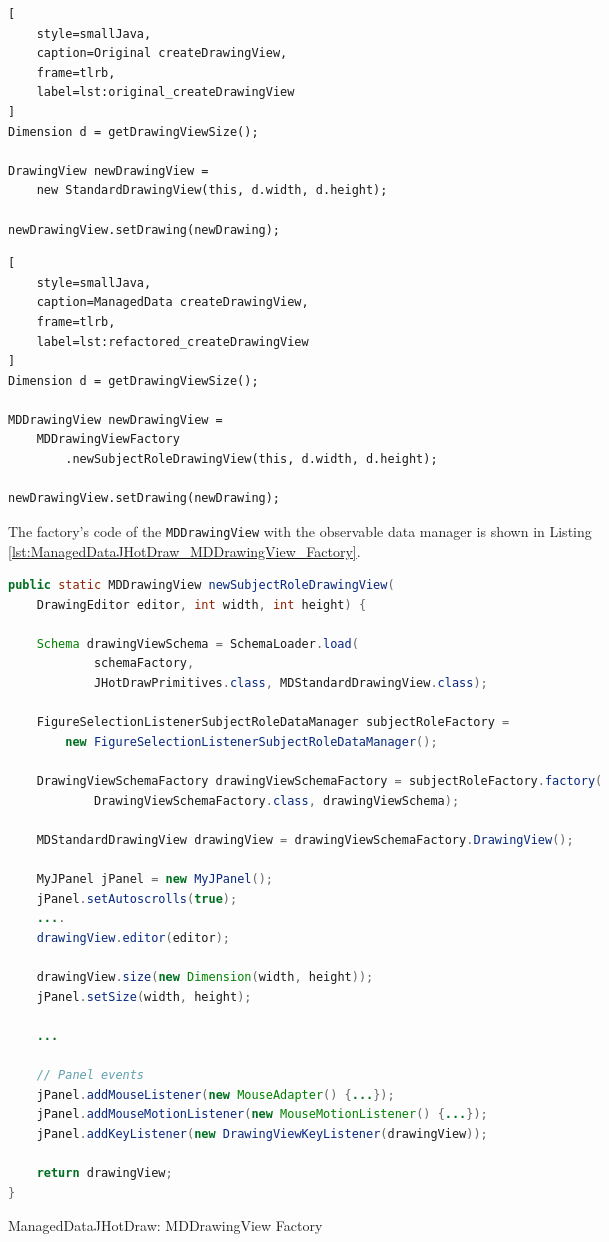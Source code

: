 \noindent\begin{minipage}{.45\textwidth}
\begin{lstlisting}[
	style=smallJava,
	caption=Original createDrawingView,
	frame=tlrb,
	label=lst:original_createDrawingView
]
Dimension d = getDrawingViewSize();

DrawingView newDrawingView = 
	new StandardDrawingView(this, d.width, d.height);

newDrawingView.setDrawing(newDrawing);
\end{lstlisting}
\end{minipage}\hfill
\begin{minipage}{.47\textwidth}
\begin{lstlisting}[
	style=smallJava,
	caption=ManagedData createDrawingView,
	frame=tlrb,
	label=lst:refactored_createDrawingView
]
Dimension d = getDrawingViewSize();

MDDrawingView newDrawingView = 
	MDDrawingViewFactory
		.newSubjectRoleDrawingView(this, d.width, d.height);

newDrawingView.setDrawing(newDrawing);
	\end{lstlisting}
\label{lst:createDrawingView}
\end{minipage}

The factory's code of the \texttt{MDDrawingView} with the observable data manager is shown in Listing \ref{lst:ManagedDataJHotDraw_MDDrawingView_Factory}.

\begin{sourcecode} [H]
	\begin{lstlisting}[language=Java]
public static MDDrawingView newSubjectRoleDrawingView(
	DrawingEditor editor, int width, int height) {

	Schema drawingViewSchema = SchemaLoader.load(
			schemaFactory,
			JHotDrawPrimitives.class, MDStandardDrawingView.class);

	FigureSelectionListenerSubjectRoleDataManager subjectRoleFactory =
		new FigureSelectionListenerSubjectRoleDataManager();

	DrawingViewSchemaFactory drawingViewSchemaFactory = subjectRoleFactory.factory(
			DrawingViewSchemaFactory.class, drawingViewSchema);

	MDStandardDrawingView drawingView = drawingViewSchemaFactory.DrawingView();

	MyJPanel jPanel = new MyJPanel();
	jPanel.setAutoscrolls(true);
	....
	drawingView.editor(editor);

	drawingView.size(new Dimension(width, height));
	jPanel.setSize(width, height);

	...

	// Panel events
	jPanel.addMouseListener(new MouseAdapter() {...});
	jPanel.addMouseMotionListener(new MouseMotionListener() {...});
	jPanel.addKeyListener(new DrawingViewKeyListener(drawingView));

	return drawingView;
}
	\end{lstlisting}
	\caption{ManagedDataJHotDraw: MDDrawingView Factory}
	\label{lst:ManagedDataJHotDraw_MDDrawingView_Factory}
\end{sourcecode}